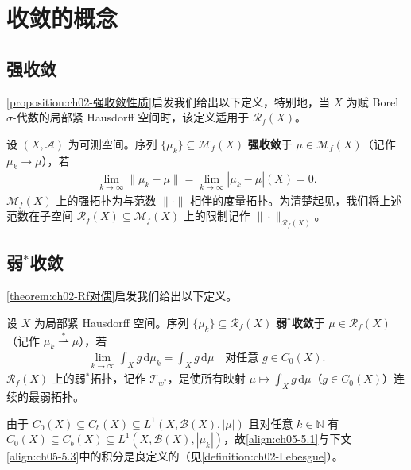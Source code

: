 \documentclass[../../main.tex]{subfiles}%
\begin{document}
\section{收敛的概念}\label{section:ch05-Radon弱星}

\subsection{强收敛}

\cref{proposition:ch02-强收敛性质}启发我们给出以下定义，特别地，当 $X$ 为赋 Borel $\sigma$-代数的局部紧 Hausdorff 空间时，该定义适用于 $\mathscr{R}_f(X)$。

\begin{definition}\label{definition:ch05-强收敛}
设 $(X,\mathcal{A})$ 为可测空间。序列 $\{\mu_k\}\subseteq\mathcal{M}_f(X)$ \textbf{强收敛}于 $\mu\in\mathcal{M}_f(X)$（记作 $\mu_k\to\mu$），若
\begin{align*}
\lim_{k\to\infty}\|\mu_k-\mu\|
=\lim_{k\to\infty}|\mu_k-\mu|(X)=0.
\end{align*}
$\mathcal{M}_f(X)$ 上的强拓扑为与范数 $\|\cdot\|$ 相伴的度量拓扑。为清楚起见，我们将上述范数在子空间 $\mathscr{R}_f(X)\subseteq\mathcal{M}_f(X)$ 上的限制记作 $\|\cdot\|_{\mathscr{R}_f(X)}$。
\end{definition}

\subsection{弱$^*$收敛}

\cref{theorem:ch02-Rf对偶}启发我们给出以下定义。

\begin{definition}\label{definition:ch05-弱星收敛}
设 $X$ 为局部紧 Hausdorff 空间。序列 $\{\mu_k\}\subseteq\mathscr{R}_f(X)$ \textbf{弱$^*$收敛}于 $\mu\in\mathscr{R}_f(X)$（记作 $\mu_k\stackrel{*}{\rightharpoonup}\mu$），若
\begin{align}
\lim_{k\to\infty}\int_X g\,\mathrm{d}\mu_k=\int_X g\,\mathrm{d}\mu
\quad\text{对任意 }g\in C_0(X).\label{align:ch05-5.1}
\end{align}
$\mathscr{R}_f(X)$ 上的弱$^*$拓扑，记作 $\mathcal{T}_{w^*}$，是使所有映射 $\mu\mapsto\int_X g\,\mathrm{d}\mu$（$g\in C_0(X)$）连续的最弱拓扑。
\end{definition}

\begin{remark}\label{remark:ch05-弱星积分}
由于 $C_0(X)\subseteq C_b(X)\subseteq L^1(X,\mathscr{B}(X),|\mu|)$ 且对任意 $k\in\mathbb{N}$ 有 $C_0(X)\subseteq C_b(X)\subseteq L^1(X,\mathscr{B}(X),|\mu_k|)$，故\eqref{align:ch05-5.1}与下文\eqref{align:ch05-5.3}中的积分是良定义的（见\cref{definition:ch02-Lebesgue}）。
\end{remark}
\end{document}
